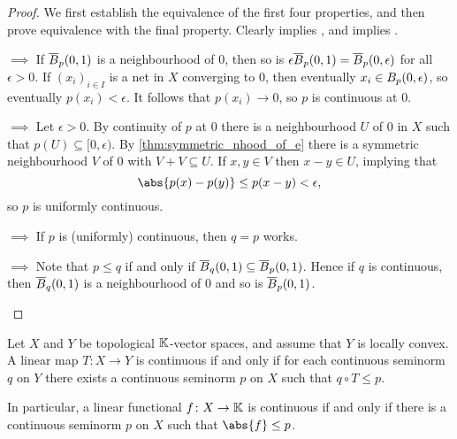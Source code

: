 \documentclass[article, a4paper, 11pt, oneside]{memoir}
\numberwithin{equation}{chapter}
\begin{document}
\begin{proof}
    We first establish the equivalence of the first four properties, and then prove equivalence with the final property. Clearly  implies , and  implies .
    \begin{proofsec}
        \item[\subcref{enum:seminorm-closed-ball} $\implies$ \subcref{enum:seminorm-continuous-at-0}]
        If $\cball[p]{0}{1}$ is a neighbourhood of $0$, then so is $\epsilon \cball[p]{0}{1} = \cball[p]{0}{\epsilon}$ for all $\epsilon > 0$. If $(x_i)_{i \in I}$ is a net in $X$ converging to $0$, then eventually $x_i \in \ball[p]{0}{\epsilon}$, so eventually $p(x_i) < \epsilon$. It follows that $p(x_i) \to 0$, so $p$ is continuous at $0$.

        \item[\subcref{enum:seminorm-continuous-at-0} $\implies$ \subcref{enum:seminorm-uniformly-continuous}]
        Let $\epsilon > 0$. By continuity of $p$ at $0$ there is a neighbourhood $U$ of $0$ in $X$ such that $p(U) \subseteq [0,\epsilon)$. By \cref{thm:symmetric_nhood_of_e} there is a symmetric neighbourhood $V$ of $0$ with $V + V \subseteq U$. If $x,y \in V$ then $x-y \in U$, implying that
        \begin{equation*}
            \abs{p(x) - p(y)}
                \leq p(x-y)
                < \epsilon,
        \end{equation*}
        so $p$ is uniformly continuous.

        \item[\subcref{enum:seminorm-uniformly-continuous} $\implies$ \subcref{enum:seminorm-continuity-domination}]
        If $p$ is (uniformly) continuous, then $q = p$ works.

        \item[\subcref{enum:seminorm-continuity-domination} $\implies$ \subcref{enum:seminorm-closed-ball}]
        Note that $p \leq q$ if and only if $\cball[q]{0}{1} \subseteq \cball[p]{0}{1}$. Hence if $q$ is continuous, then $\cball[q]{0}{1}$ is a neighbourhood of $0$ and so is $\cball[p]{0}{1}$.
    \end{proofsec}
\end{proof}


\begin{proposition}
    \label{thm:continuity-by-seminorm-domination}
    Let $X$ and $Y$ be topological $\field$-vector spaces, and assume that $Y$ is locally convex. A linear map $T \colon X \to Y$ is continuous if and only if for each continuous seminorm $q$ on $Y$ there exists a continuous seminorm $p$ on $X$ such that $q \circ T \leq p$.

    In particular, a linear functional $f \colon X \to \field$ is continuous if and only if there is a continuous seminorm $p$ on $X$ such that $\abs{f} \leq p$.
\end{proposition}
\end{document}
